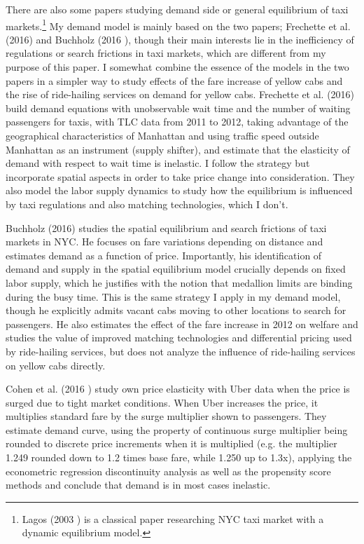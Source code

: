 There are also some papers studying demand side or general equilibrium of taxi markets.\footnote{Lagos (2003 \cite{lagos2003analysis}) is a classical paper researching NYC taxi market with a dynamic equilibrium model.} My demand model is mainly based on the two papers; Frechette et al. (2016) and Buchholz (2016 \cite{buchholz2016spatial}), though their main interests lie in the inefficiency of regulations or search frictions in taxi markets, which are different from my purpose of this paper. I somewhat combine the essence of the models in the two papers in a simpler way to study effects of the fare increase of yellow cabs and the rise of ride-hailing services on demand for yellow cabs. Frechette et al. (2016) build demand equations with unobservable wait time and the number of waiting passengers for taxis, with TLC data from 2011 to 2012, taking advantage of the geographical characteristics of Manhattan and using traffic speed outside Manhattan as an instrument (supply shifter), and estimate that the elasticity of demand with respect to wait time is inelastic. I follow the strategy but incorporate spatial aspects in order to take price change into consideration. They also model the labor supply dynamics to study how the equilibrium is influenced by taxi regulations and also matching technologies, which I don't.

Buchholz (2016) studies the spatial equilibrium and search frictions of taxi markets in NYC. He focuses on fare variations depending on distance and estimates demand as a function of price. Importantly, his identification of demand and supply in the spatial equilibrium model crucially depends on fixed labor supply, which he justifies with the notion that medallion limits are binding during the busy time. This is the same strategy I apply in my demand model, though he explicitly admits vacant cabs moving to other locations to search for passengers. He also estimates the effect of the fare increase in 2012 on welfare and studies the value of improved matching technologies and differential pricing used by ride-hailing services, but does not analyze the influence of ride-hailing services on yellow cabs directly.

Cohen et al. (2016 \cite{cohen2016using}) study own price elasticity with Uber data when the price is surged due to tight market conditions. When Uber increases the price, it multiplies standard fare by the surge multiplier shown to passengers. They estimate demand curve, using the property of continuous surge multiplier being rounded to discrete price increments when it is multiplied (e.g. the multiplier 1.249 rounded down to 1.2 times base fare, while 1.250 up to 1.3x), applying the econometric regression discontinuity analysis as well as the propensity score methods and conclude that demand is in most cases inelastic.
